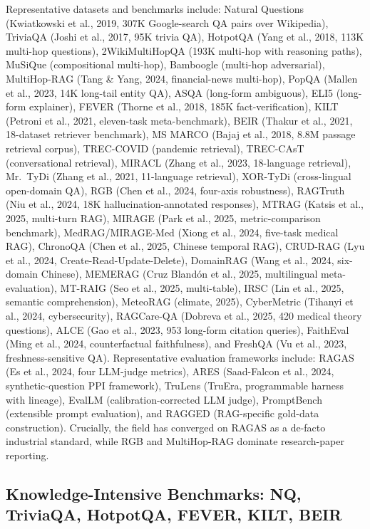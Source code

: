 Representative datasets and benchmarks include: Natural Questions (Kwiatkowski et al., 2019, 307K Google-search QA pairs over Wikipedia), TriviaQA (Joshi et al., 2017, 95K trivia QA), HotpotQA (Yang et al., 2018, 113K multi-hop questions), 2WikiMultiHopQA (193K multi-hop with reasoning paths), MuSiQue (compositional multi-hop), Bamboogle (multi-hop adversarial), MultiHop-RAG (Tang \& Yang, 2024, financial-news multi-hop), PopQA (Mallen et al., 2023, 14K long-tail entity QA), ASQA (long-form ambiguous), ELI5 (long-form explainer), FEVER (Thorne et al., 2018, 185K fact-verification), KILT (Petroni et al., 2021, eleven-task meta-benchmark), BEIR (Thakur et al., 2021, 18-dataset retriever benchmark), MS MARCO (Bajaj et al., 2018, 8.8M passage retrieval corpus), TREC-COVID (pandemic retrieval), TREC-CAsT (conversational retrieval), MIRACL (Zhang et al., 2023, 18-language retrieval), Mr.~TyDi (Zhang et al., 2021, 11-language retrieval), XOR-TyDi (cross-lingual open-domain QA), RGB (Chen et al., 2024, four-axis robustness), RAGTruth (Niu et al., 2024, 18K hallucination-annotated responses), MTRAG (Katsis et al., 2025, multi-turn RAG), MIRAGE (Park et al., 2025, metric-comparison benchmark), MedRAG/MIRAGE-Med (Xiong et al., 2024, five-task medical RAG), ChronoQA (Chen et al., 2025, Chinese temporal RAG), CRUD-RAG (Lyu et al., 2024, Create-Read-Update-Delete), DomainRAG (Wang et al., 2024, six-domain Chinese), MEMERAG (Cruz Blandón et al., 2025, multilingual meta-evaluation), MT-RAIG (Seo et al., 2025, multi-table), IRSC (Lin et al., 2025, semantic comprehension), MeteoRAG (climate, 2025), CyberMetric (Tihanyi et al., 2024, cybersecurity), RAGCare-QA (Dobreva et al., 2025, 420 medical theory questions), ALCE (Gao et al., 2023, 953 long-form citation queries), FaithEval (Ming et al., 2024, counterfactual faithfulness), and FreshQA (Vu et al., 2023, freshness-sensitive QA). Representative evaluation frameworks include: RAGAS (Es et al., 2024, four LLM-judge metrics), ARES (Saad-Falcon et al., 2024, synthetic-question PPI framework), TruLens (TruEra, programmable harness with lineage), EvalLM (calibration-corrected LLM judge), PromptBench (extensible prompt evaluation), and RAGGED (RAG-specific gold-data construction). Crucially, the field has converged on RAGAS as a de-facto industrial standard, while RGB and MultiHop-RAG dominate research-paper reporting.

\subsection{Knowledge-Intensive Benchmarks: NQ, TriviaQA, HotpotQA, FEVER, KILT, BEIR}\label{knowledge-intensive-benchmarks-nq-triviaqa-hotpotqa-fever-kilt-beir}


